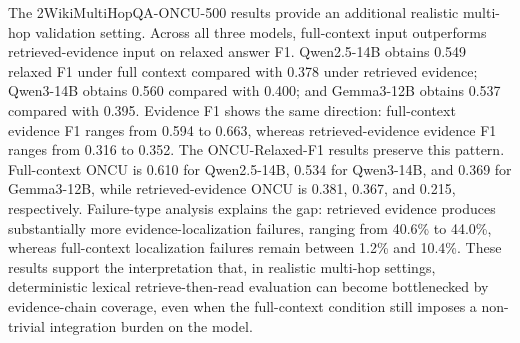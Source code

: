 The 2WikiMultiHopQA-ONCU-500 results provide an additional realistic multi-hop validation setting. Across all three models, full-context input outperforms retrieved-evidence input on relaxed answer F1. Qwen2.5-14B obtains 0.549 relaxed F1 under full context compared with 0.378 under retrieved evidence; Qwen3-14B obtains 0.560 compared with 0.400; and Gemma3-12B obtains 0.537 compared with 0.395. Evidence F1 shows the same direction: full-context evidence F1 ranges from 0.594 to 0.663, whereas retrieved-evidence evidence F1 ranges from 0.316 to 0.352. The ONCU-Relaxed-F1 results preserve this pattern. Full-context ONCU is 0.610 for Qwen2.5-14B, 0.534 for Qwen3-14B, and 0.369 for Gemma3-12B, while retrieved-evidence ONCU is 0.381, 0.367, and 0.215, respectively. Failure-type analysis explains the gap: retrieved evidence produces substantially more evidence-localization failures, ranging from 40.6\% to 44.0\%, whereas full-context localization failures remain between 1.2\% and 10.4\%. These results support the interpretation that, in realistic multi-hop settings, deterministic lexical retrieve-then-read evaluation can become bottlenecked by evidence-chain coverage, even when the full-context condition still imposes a non-trivial integration burden on the model.